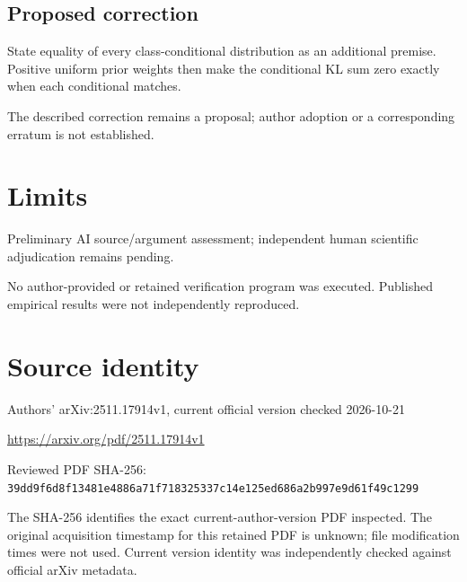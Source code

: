 \documentclass[11pt]{article}
\begin{document}
\subsection*{Proposed correction}

State equality of every class-conditional distribution as an additional premise. Positive uniform prior weights then make the conditional KL sum zero exactly when each conditional matches.

The described correction remains a proposal; author adoption or a corresponding erratum is not established.

\section*{Limits}

Preliminary AI source/argument assessment; independent human scientific adjudication remains pending.\par

No author-provided or retained verification program was executed. Published empirical results were not independently reproduced.\par

\section*{Source identity}

Authors’ arXiv:2511.17914v1, current official version checked 2026-10-21

\url{https://arxiv.org/pdf/2511.17914v1}

Reviewed PDF SHA-256: \nolinkurl{39dd9f6d8f13481e4886a71f718325337c14e125ed686a2b997e9d61f49c1299}

The SHA-256 identifies the exact current-author-version PDF inspected. The original acquisition timestamp for this retained PDF is unknown; file modification times were not used. Current version identity was independently checked against official arXiv metadata.
\end{document}
